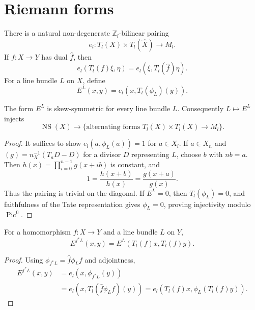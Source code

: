 
\section{Riemann forms}
\label{mumford-IV20-source}

\begin{proposition}
\label{mumford-prop-tate-riemann-pairing}
There is a natural non-degenerate $\mathbb Z_l$-bilinear pairing
\[
e_l:T_l(X)\times T_l(\widehat X)\longrightarrow M_l.
\]
If $f:X\to Y$ has dual $\widehat f$, then
\[
e_l(T_l(f)\xi,\eta)=e_l(\xi,T_l(\widehat f)\eta).
\]
For a line bundle $L$ on $X$, define
\[
E^L(x,y)=e_l(x,T_l(\phi_L)(y)).
\]
\end{proposition}

\begin{theorem}
\label{mumford-thm-riemann-form-skew}
The form $E^L$ is skew-symmetric for every line bundle $L$.
Consequently $L\mapsto E^L$ injects
\[
\operatorname{NS}(X)\longrightarrow
\{\text{alternating forms }T_l(X)\times T_l(X)\to M_l\}.
\]
\end{theorem}
\begin{proof}
It suffices to show $e_l(a,\phi_L(a))=1$ for $a\in X_l$. If $a\in X_n$
and $(g)=n_X^{-1}(T_aD-D)$ for a divisor $D$ representing $L$, choose
$b$ with $nb=a$. Then $h(x)=\prod_{i=0}^{n-1}g(x+ib)$ is constant, and
\[
1=\frac{h(x+b)}{h(x)}=\frac{g(x+a)}{g(x)}.
\]
Thus the pairing is trivial on the diagonal. If $E^L=0$, then
$T_l(\phi_L)=0$, and faithfulness of the Tate representation gives
$\phi_L=0$, proving injectivity modulo $\operatorname{Pic}^0$.
\end{proof}

\begin{proposition}
\label{mumford-prop-riemann-form-pullback}
For a homomorphism $f:X\to Y$ and a line bundle $L$ on $Y$,
\[
E^{f^*L}(x,y)=E^L(T_l(f)x,T_l(f)y).
\]
\end{proposition}
\begin{proof}
Using $\phi_{f^*L}=\widehat f\phi_Lf$ and adjointness,
\[
\begin{aligned}
E^{f^*L}(x,y)&=e_l(x,\phi_{f^*L}(y))\\
&=e_l(x,T_l(\widehat f\phi_Lf)(y))
=e_l(T_l(f)x,\phi_L(T_l(f)y)).
\end{aligned}
\]
\end{proof}

